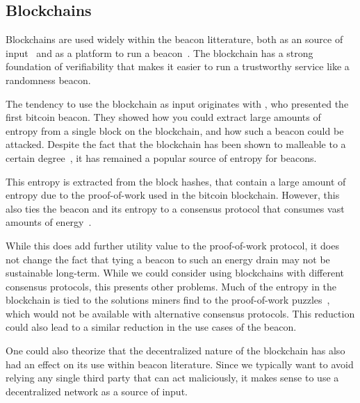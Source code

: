 \subsection{Blockchains}
Blockchains are used widely within the beacon litterature, both as an source of input~\cite{bonneau2015bitcoin, bentov2016bitcoin, bunz2017proofsof} and as a platform to run a beacon~\cite{randao, bunz2017proofsof}.
The blockchain has a strong foundation of verifiability that makes it easier to run a trustworthy service like a randomness beacon.

The tendency to use the blockchain as input originates with \citet{bonneau2015bitcoin}, who presented the first bitcoin beacon.
They showed how you could extract large amounts of entropy from a single block on the blockchain, and how such a beacon could be attacked.
Despite the fact that the blockchain has been shown to malleable to a certain degree~\cite{pierrot2016malleability}, it has remained a popular source of entropy for beacons.

This entropy is extracted from the block hashes, that contain a large amount of entropy due to the proof-of-work used in the bitcoin blockchain.
However, this also ties the beacon and its entropy to a consensus protocol that consumes vast amounts of energy~\cite{bitcoinenergy}.

While this does add further utility value to the proof-of-work protocol, it does not change the fact that tying a beacon to such an energy drain may not be sustainable long-term.
While we could consider using blockchains with different consensus protocols, this presents other problems.
Much of the entropy in the blockchain is tied to the solutions miners find to the proof-of-work puzzles~\cite{bonneau2015bitcoin}, which would not be available with alternative consensus protocols.
This reduction could also lead to a similar reduction in the use cases of the beacon.

One could also theorize that the decentralized nature of the blockchain has also had an effect on its use within beacon literature.
Since we typically want to avoid relying any single third party that can act maliciously, it makes sense to use a decentralized network as a source of input.

